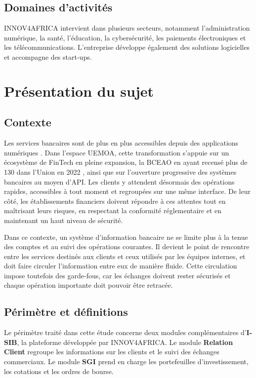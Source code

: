 \subsection{Domaines d'activités}

INNOV4AFRICA intervient dans plusieurs secteurs, notamment l'administration numérique, la santé, l'éducation, la cybersécurité, les paiements électroniques et les télécommunications. L'entreprise développe également des solutions logicielles et accompagne des start-ups.


\section{Présentation du sujet}
\subsection{Contexte}

Les services bancaires sont de plus en plus accessibles depuis des applications
numériques \cite{vives_digital_banking}. Dans l'espace UEMOA, cette
transformation s'appuie sur un écosystème de FinTech en pleine expansion, la
BCEAO en ayant recensé plus de 130 dans l'Union en 2022 \cite{bceao_fintech},
ainsi que sur l'ouverture progressive des systèmes bancaires au moyen d'API. Les
clients y attendent désormais des opérations rapides, accessibles à tout moment
et regroupées sur une même interface. De leur côté, les établissements
financiers doivent répondre à ces attentes tout en maîtrisant leurs risques, en
respectant la conformité réglementaire et en maintenant un haut niveau de
sécurité.

Dans ce contexte, un système d'information bancaire ne se limite plus à la tenue
des comptes et au suivi des opérations courantes. Il devient le point de
rencontre entre les services destinés aux clients et ceux utilisés par les
équipes internes, et doit faire circuler l'information entre eux de manière
fluide. Cette circulation impose toutefois des garde-fous, car les échanges
doivent rester sécurisés et chaque opération importante doit pouvoir être
retracée.

\subsection{Périmètre et définitions}

Le périmètre traité dans cette étude concerne deux modules complémentaires
d'\textbf{I-SIB}, la plateforme développée par INNOV4AFRICA. Le module
\textbf{Relation Client} regroupe les informations sur les clients et le suivi
des échanges commerciaux. Le module \textbf{SGI} prend en charge les
portefeuilles d'investissement, les cotations et les ordres de bourse.

